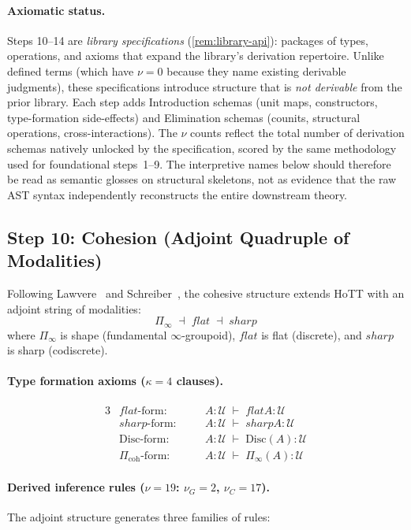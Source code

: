 \documentclass[11pt,a4paper]{article}
\def\flat{flat}%
\def\sharp{sharp}%
\theoremstyle{plain}
\theoremstyle{definition}
\theoremstyle{remark}
\newcommand{\U}{\mathcal{U}}
\begin{document}
\paragraph{Axiomatic status.}
Steps 10--14 are \emph{library specifications} (\cref{rem:library-api}): packages of types, operations, and axioms that expand the library's derivation repertoire.
Unlike defined terms (which have $\nu = 0$ because they name existing derivable judgments), these specifications introduce structure that is \emph{not derivable} from the prior library.
Each step adds Introduction schemas (unit maps, constructors, type-formation side-effects) and Elimination schemas (counits, structural operations, cross-interactions).
The $\nu$ counts reflect the total number of derivation schemas natively unlocked by the specification, scored by the same methodology used for foundational steps~1--9.
The interpretive names below should therefore be read as semantic glosses on structural skeletons, not as evidence that the raw AST syntax independently reconstructs the entire downstream theory.

\subsection{Step 10: Cohesion (Adjoint Quadruple of Modalities)}
\label{app:cohesion-spec}

Following Lawvere~\cite{lawvere} and Schreiber~\cite{schreiber}, the cohesive structure extends HoTT with an adjoint string of modalities:
\[
    \Pi_{\!\infty} \;\dashv\; \flat \;\dashv\; \sharp
\]
where $\Pi_{\!\infty}$ is shape (fundamental $\infty$-groupoid), $\flat$ is flat (discrete), and $\sharp$ is sharp (codiscrete).

\paragraph{Type formation axioms ($\kappa = 4$ clauses).}
\begin{alignat*}{3}
    &\flat\text{-form:}   &\quad& A : \U \;\vdash\; \flat A : \U \\
    &\sharp\text{-form:}  && A : \U \;\vdash\; \sharp A : \U \\
    &\mathrm{Disc}\text{-form:} && A : \U \;\vdash\; \mathrm{Disc}(A) : \U \\
    &\Pi_{\mathrm{coh}}\text{-form:} && A : \U \;\vdash\; \Pi_{\!\infty}(A) : \U
\end{alignat*}

\paragraph{Derived inference rules ($\nu = 19$: $\nu_G = 2$, $\nu_C = 17$).}
The adjoint structure generates three families of rules:
\end{document}
